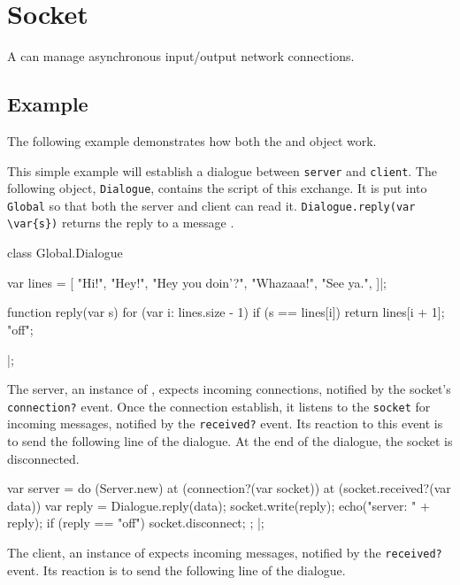 \section{Socket}

A  can manage asynchronous input/output network
connections.

\subsection{Example}

The following example demonstrates how both the  and
 object work.

This simple example will establish a dialogue between
\lstinline|server| and \lstinline|client|.  The following object,
\lstinline|Dialogue|, contains the script of this exchange.  It is put
into \lstinline|Global| so that both the server and client can read
it.  \lstinline|Dialogue.reply(var \var{s})| returns the reply to a
message .

\begin{urbiscript}
class Global.Dialogue
{
  var lines =
  [
    "Hi!",
    "Hey!",
    "Hey you doin'?",
    "Whazaaa!",
    "See ya.",
  ]|;

  function reply(var s)
  {
    for (var i: lines.size - 1)
      if (s == lines[i])
        return lines[i + 1];
    "off";
  }
}|;
\end{urbiscript}

The server, an instance of , expects incoming
connections, notified by the socket's \lstinline|connection?| event.
Once the connection establish, it listens to the \lstinline|socket|
for incoming messages, notified by the \lstinline|received?| event.
Its reaction to this event is to send the following line of the
dialogue.  At the end of the dialogue, the socket is disconnected.

\begin{urbiscript}
var server =
  do (Server.new)
  {
    at (connection?(var socket))
      at (socket.received?(var data))
      {
        var reply = Dialogue.reply(data);
        socket.write(reply);
        echo("server: " + reply);
        if (reply == "off")
          socket.disconnect;
      };
  }|;
\end{urbiscript}

The client, an instance of  expects incoming
messages, notified by the \lstinline|received?| event.  Its reaction
is to send the following line of the dialogue.


